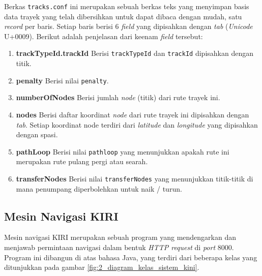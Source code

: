 Berkas \texttt{tracks.conf} ini merupakan sebuah berkas teks yang menyimpan basis data trayek yang telah dibersihkan untuk dapat dibaca dengan mudah, satu \textit{record} per baris. Setiap baris berisi 6 \textit{field} yang dipisahkan dengan \textit{tab} (\textit{Unicode} U+0009\cite{unicode8}). Berikut adalah penjelasan dari keenam \textit{field} tersebut:

\begin{enumerate}
	\item \textbf{trackTypeId.trackId} Berisi \texttt{trackTypeId} dan \texttt{trackId} dipisahkan dengan titik.
	\item \textbf{penalty} Berisi nilai \texttt{penalty}.
	\item \textbf{numberOfNodes} Berisi jumlah \textit{node} (titik) dari rute trayek ini.
	\item \textbf{nodes} Berisi daftar koordinat \textit{node} dari rute trayek ini dipisahkan dengan \textit{tab}. Setiap koordinat node terdiri dari \textit{latitude} dan \textit{longitude} yang dipisahkan dengan spasi.
	\item \textbf{pathLoop} Berisi nilai \texttt{pathloop} yang menunjukkan apakah rute ini merupakan rute pulang pergi atau searah.
	\item \textbf{transferNodes} Berisi nilai \texttt{transferNodes} yang menunjukkan titik-titik di mana penumpang diperbolehkan untuk naik / turun.
\end{enumerate}

\subsection{Mesin Navigasi KIRI}

Mesin navigasi KIRI merupakan sebuah program yang mendengarkan dan menjawab permintaan navigasi dalam bentuk \textit{HTTP request} di \textit{port} 8000. Program ini dibangun di atas bahasa Java, yang terdiri dari beberapa kelas yang ditunjukkan pada gambar \ref{fig:2_diagram_kelas_sistem_kini}.

